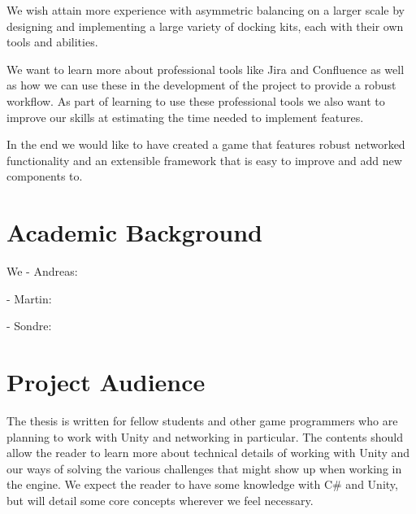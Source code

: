 We wish attain more experience with asymmetric balancing on a larger scale by designing and implementing a large variety of docking kits, each with their own tools and abilities. 

We want to learn more about professional tools like Jira and Confluence as well as how we can use these in the development of the project to provide a robust workflow. As part of learning to use these professional tools we also want to improve our skills at estimating the time needed to implement features. 

In the end we would like to have created a game that features robust networked functionality and an extensible framework that is easy to improve and add new components to. 

\section{Academic Background}
We
 - Andreas:

 - Martin:

 - Sondre:

\section{Project Audience}
The thesis is written for fellow students and other game programmers who are planning to work with Unity and networking in particular. The contents should allow the reader to learn more about technical details of working with Unity and our ways of solving the various challenges that might show up when working in the engine. 
We expect the reader to have some knowledge with C\# and Unity, but will detail some core concepts wherever we feel necessary. 
  

